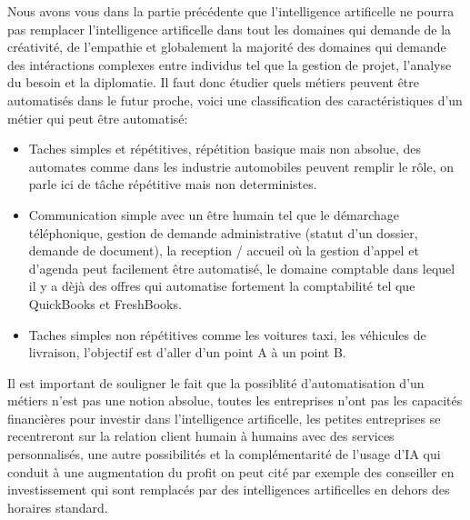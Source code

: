         Nous avons vous dans la partie précédente que l'intelligence artificelle
        ne pourra pas remplacer l'intelligence artificelle dans tout 
        les domaines qui demande de la créativité, de l'empathie et globalement 
        la majorité des domaines qui demande des intéractions complexes entre 
        individus tel que la gestion de projet, l'analyse du besoin et la 
        diplomatie. Il faut donc étudier quels métiers peuvent être automatisés dans le futur proche,
        voici une classification des caractéristiques d'un métier qui peut être automatisé:
        \newline
        \begin{itemize}
            \item Taches simples et répétitives, répétition basique mais non absolue, des automates 
            comme dans les industrie automobiles peuvent remplir le rôle, on parle ici de tâche 
            répétitive mais non deterministes.
            \newline

            \item Communication simple avec un être humain tel que le démarchage téléphonique,
            gestion de demande administrative (statut d'un dossier, demande de document), 
            la reception / accueil où la gestion d'appel et d'agenda peut facilement être automatisé,
            le domaine comptable dans lequel il y a dèjà des offres qui automatise fortement 
            la comptabilité tel que QuickBooks et FreshBooks.
            \newline

            \item Taches simples non répétitives comme 
            les voitures taxi, les véhicules de livraison, l'objectif est d'aller d'un point A à 
            un point B. \newline
        \end{itemize}

        Il est important de souligner le fait que la possiblité d'automatisation d'un métiers 
        n'est pas une notion absolue, toutes les entreprises n'ont pas 
        les capacités financières pour investir dans l'intelligence artificelle, les petites entreprises 
        se recentreront sur la relation client humain à humains avec des services personnalisés,
        une autre possibilités et la complémentarité de l'usage d'IA qui conduit à une augmentation 
        du profit on peut cité par exemple des conseiller en investissement qui sont remplacés 
        par des intelligences artificelles en dehors des horaires standard. \newline

